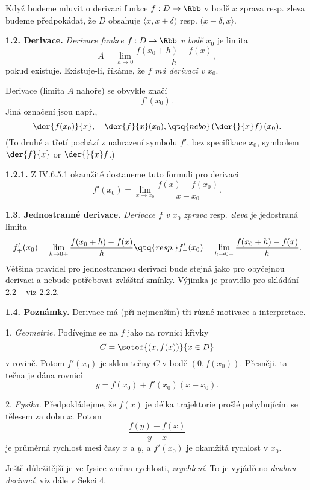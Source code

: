 \documentclass[12pt]{article}
\begin{document}
{Když budeme mluvit o derivaci funkce
 $f:D\to\Rbb$ v bodě $x$ zprava resp. zleva budeme předpokádat, že 
  $D$ obsahuje $\langle x,x+\delta)$ resp. $(x-\delta,x\rangle$.
 
 \bigskip
 
 {\bf 1.2. Derivace.}  {\em Derivace funkce $f:D\to\Rbb$ v bodě  $x_0$} je limita
 $$
 A=\lim_{h\to 0}\frac{f(x_0+h)-f(x)}{h},
 $$
 pokud existuje. Existuje-li, říkáme, že $f$ {\em má derivaci v} $x_0$.
 
 Derivace (limita $A$ nahoře) se obvykle značí
 $$
 f'(x_0).
 $$
Jiná označení jsou např., 
 $$
 \der{f(x_0)}{x}, \quad \der{f}{x}(x_0),\qtq{nebo} \left(\der{}{x}f\right)(x_0).
 $$
 (To druhé a třetí pochází z nahrazení symbolu  $f'$,  bez specifikace $x_0$, symbolem $\der{f}{x}$ or $\der{}{x}f$.)
 


 
 \medskip
  
 {\bf 1.2.1.} Z IV.6.5.1 okamžitě dostaneme tuto formuli pro derivaci
 \begin{equation}
 f'(x_0)=\lim_{x\to x_0}\frac{f(x)-f(x_0)}{x-x_0}.  \tag{$*$}
 \end{equation}
 
 \bigskip
 
 {\bf 1.3. Jednostranné derivace.} {\em Derivace $f$ v $x_0$ zprava} resp. {\em zleva} je jedostraná limita
 $$
 f'_+(x_0)=\lim_{h\to 0+}\frac{f(x_0+h)-f(x)}{h} \qtq{resp.}
 f'_-(x_0)=\lim_{h\to 0-}\frac{f(x_0+h)-f(x)}{h}.
 $$
 Většina pravidel pro jednostrannou derivaci bude stejná jako pro obyčejnou derivaci a nebude potřebovat zvláštní zmínky. Výjimka je pravidlo pro skládání 2.2  -- viz 2.2.2.
 
 \bigskip
 
 {\bf 1.4. Poznámky.} Derivace má (při nejmenším) tři různé motivace a interpretace.
 
 \smallskip
 
 1. {\em Geometrie.} Podívejme se na $f$ jako na rovnici křivky
 $$
 C=\setof{(x,f(x))}{x\in D}
 $$
 v rovině. Potom $f'(x_0)$ je sklon tečny $C$ v bodě
 $(0,f(x_0))$. Přesněji, ta tečna je dána rovnicí
 $$
 y=f(x_0)+f'(x_0)(x-x_0).
 $$
 
 \smallskip
 
 2. {\em Fysika.} Předpokládejme, že $f(x)$ je délka trajektorie prošlé pohybujícím se tělesem za dobu  $x$. Potom
 $$
 \frac{f(y)-f(x)}{y-x}
 $$
 je průměrná rychlost mesi časy $x$ a $y$, a $f'(x_0)$ je okamžitá rychlost v $x_0$.
  
	Ještě důležitější je ve fysice změna rychlosti, {\em zrychlení}. To je vyjádřeno  {\em druhou derivací}, viz dále v Sekci 4.
 
}
\end{document}

